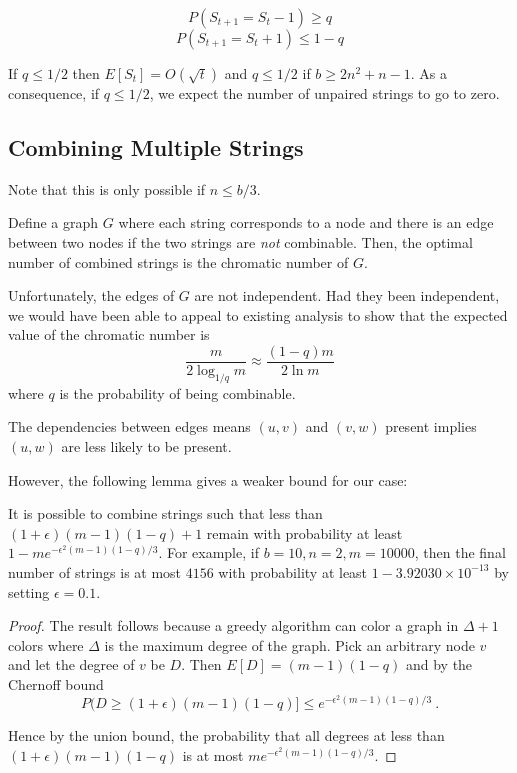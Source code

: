 \[P(S_{t+1}=S_t-1)\geq q\]
\[P(S_{t+1}=S_t+1)\leq 1-q\]

If $q\leq 1/2$ then $E[S_t]=O(\sqrt{t})$ and $q\leq 1/2$ if $b\geq
2n^2+n-1$. As a consequence, if $q\leq 1/2$,  we expect the number of
unpaired strings to go to zero.

\subsection{Combining Multiple Strings}
Note that this is only possible if $n\leq b/3$.

\begin{lemma}
Define a graph $G$ where each string corresponds to a node and there
is an edge between two nodes if the two strings are \emph{not}
combinable. Then, the optimal number of combined strings is the
chromatic number of $G$.
\end{lemma}

Unfortunately, the edges of $G$ are not independent. Had they been
independent, we would have been able to appeal to existing analysis to
show that the expected value of the chromatic number is
\[
\frac{m}{2\log_{1/q} m}\approx \frac{(1-q)m}{2 \ln m}
\]
where $q$ is the probability of being combinable. 

The dependencies between edges means $(u,v)$ and $(v,w)$ present
implies $(u,w)$ are less likely to be present.

However, the following lemma gives a weaker bound for our case:
\begin{lemma}
It is possible to combine strings such that less than $(1+\epsilon)
(m-1)(1-q)+1$ remain with probability at least $1-me^{-\epsilon^2
  (m-1)(1-q)/3}$. For example, if $b=10, n=2, m=10000$, then the final
number of strings is at most $4156$ with probability at least
$1-3.92030 \times 10^{-13}$ by setting $\epsilon=0.1$.
\end{lemma}

\begin{proof}
The result follows because a greedy algorithm can color a graph in
$\Delta+1$ colors where $\Delta$ is the maximum degree of the graph.
Pick an arbitrary node $v$ and let the degree of $v$ be $D$. Then
$E[D]=(m-1)(1-q)$ and by the Chernoff bound
\[P(D\geq (1+\epsilon) (m-1)(1-q)] \leq e^{-\epsilon^2 (m-1)(1-q)/3}
 \ .\]

Hence by the union bound, the probability that all degrees at less
than $(1+\epsilon) (m-1)(1-q)$ is at most $me^{-\epsilon^2
  (m-1)(1-q)/3}$.

\end{proof}
